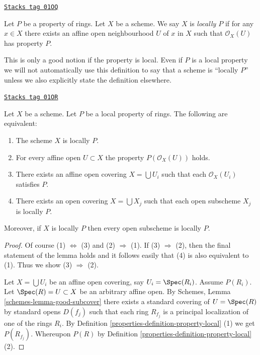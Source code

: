 \begin{definition}[Locally P]
\label{properties-definition-locally-P}
\href{https://stacks.math.columbia.edu/tag/01OQ}{\texttt{Stacks tag 01OQ}}

Let $P$ be a property of rings. Let $X$ be a scheme.
We say $X$ is {\it locally $P$} if for any $x \in X$
there exists an affine open neighbourhood $U$ of $x$
in $X$ such that $\mathcal{O}_X(U)$ has property $P$.
\end{definition}

This is only a good notion if the property is local.
Even if $P$ is a local property we will not
automatically use this definition to say that a scheme is
``locally $P$'' unless we also explicitly state the definition
elsewhere.

\begin{lemma}[Locally P]
\label{properties-lemma-locally-P}
\href{https://stacks.math.columbia.edu/tag/01OR}{\texttt{Stacks tag 01OR}}

Let $X$ be a scheme. Let $P$ be a local property of rings.
The following are equivalent:
\begin{enumerate}
\item The scheme $X$ is locally $P$.
\item For every affine open $U \subset X$ the property
$P(\mathcal{O}_X(U))$ holds.
\item There exists an affine open covering $X = \bigcup U_i$ such that
each $\mathcal{O}_X(U_i)$ satisfies $P$.
\item There exists an open covering $X = \bigcup X_j$
such that each open subscheme $X_j$ is locally $P$.
\end{enumerate}
Moreover, if $X$ is locally $P$ then every open subscheme
is locally $P$.
\end{lemma}

\begin{proof}

Of course (1) $\Leftrightarrow$ (3) and (2) $\Rightarrow$ (1).
If (3) $\Rightarrow$ (2), then the final statement of the lemma
holds and it follows easily that (4) is also equivalent to (1).
Thus we show (3) $\Rightarrow$ (2).

\medskip\noindent
Let $X = \bigcup U_i$ be an affine open covering, say
$U_i = \Spec(R_i)$. Assume $P(R_i)$.
Let $\Spec(R) = U \subset X$ be an arbitrary affine open.
By Schemes, Lemma \ref{schemes-lemma-good-subcover}
there exists a standard covering of $U = \Spec(R)$ by
standard opens $D(f_j)$ such that each ring $R_{f_j}$ is a
principal localization of one of the rings $R_i$. By
Definition \ref{properties-definition-property-local} (1) we get $P(R_{f_j})$.
Whereupon $P(R)$ by Definition \ref{properties-definition-property-local} (2).
\end{proof}

